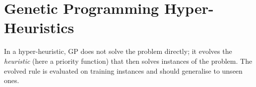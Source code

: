 \section{Genetic Programming Hyper-Heuristics}
In a hyper-heuristic, GP does not solve the problem directly; it evolves the
\emph{heuristic} (here a priority function) that then solves instances of the
problem. The evolved rule is evaluated on training instances and should
generalise to unseen ones.
